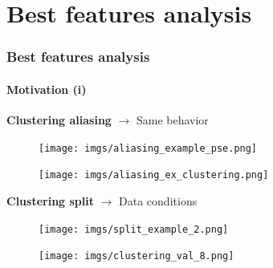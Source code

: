\documentclass{beamer}
\begin{document}

\section{Best features analysis}

\begin{frame}
	\frametitle{Best features analysis}
	\framesubtitle{Motivation (i)}

\textbf{Clustering aliasing} $\rightarrow$ Same behavior
	\begin{multicols}{2}
		\begin{figure}
			\texttt{[image: imgs/aliasing\_example\_pse.png]}
		\end{figure}
		\columnbreak
		\begin{figure}
			\texttt{[image: imgs/aliasing\_ex\_clustering.png]}
		\end{figure}
	\end{multicols}
\vfill
\pause
\textbf{Clustering split} $\rightarrow$ Data conditions
	\begin{multicols}{2}
		\begin{figure}
			\texttt{[image: imgs/split\_example\_2.png]}
		\end{figure}
		\columnbreak
		\begin{figure}
			\texttt{[image: imgs/clustering\_val\_8.png]}
		\end{figure}
	\end{multicols}
\end{frame}
\end{document}
